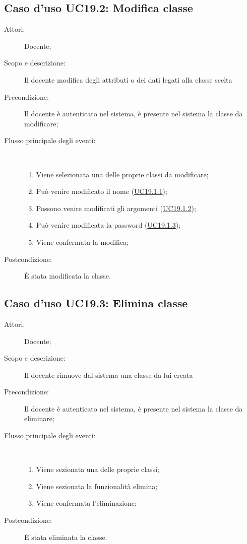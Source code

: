\subsection{Caso d'uso UC19.2: Modifica classe}\begin{description}
	\item[Attori:] Docente;
	\item[Scopo e descrizione:] Il docente modifica degli attributi o dei dati legati alla classe scelta
	\item[Precondizione:] Il docente è autenticato nel sistema, è presente nel sistema la classe da modificare;
	
	\item[Flusso principale degli eventi:] \ 
	\begin{enumerate}
		\item Viene selezionata una delle proprie classi da modificare;
		\item Può venire modificato il nome (\hyperlink{UC19.1.1}{UC19.1.1});
		\item Possono venire modificati gli argomenti (\hyperlink{UC19.1.2}{UC19.1.2});
		\item Può venire modificata la password (\hyperlink{UC19.1.3}{UC19.1.3});
		\item Viene confermata la modifica;
		
	\end{enumerate}
	\item[Postcondizione:] È stata modificata la classe.
\end{description}
\hypertarget{UC19.3}{}
\subsection{Caso d'uso UC19.3: Elimina classe}\begin{description}
	\item[Attori:] Docente;
	\item[Scopo e descrizione:] Il docente rimuove dal sistema una classe da lui creata 
	\item[Precondizione:] Il docente è autenticato nel sistema, è presente nel sistema la classe da eliminare;
	
	\item[Flusso principale degli eventi:] \ 
	\begin{enumerate}
		\item Viene sezionata una delle proprie classi;
		\item Viene sezionata la funzionalità elimina;
		\item Viene confermata l'eliminazione;
		
	\end{enumerate}
	\item[Postcondizione:] È stata eliminata la classe.
\end{description}
\hypertarget{UC19.4}{}

